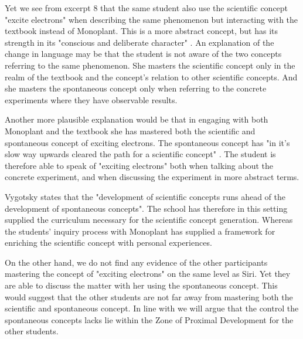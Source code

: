 
Yet we see from excerpt 8 that the same student also use the scientific concept "excite electrons" when describing the same phenomenon but interacting with the textbook instead of Monoplant. This is a more abstract concept, but has its strength in its "conscious and deliberate character" \citep{vygotsky2012thought}. An explanation of the change in language may be that the student is not aware of the two concepts referring to the same phenomenon. She masters the scientific concept only in the realm of the textbook and the concept's relation to other scientific concepts. And she masters the spontaneous concept only when referring to the concrete experiments where they have observable results. 

Another more plausible explanation would be that in engaging with both Monoplant and the textbook she has mastered both the scientific and spontaneous concept of exciting electrons. The spontaneous concept has "in it's slow way upwards cleared the path for a scientific concept" \citep{vygotsky2012thought}. The student is therefore able to speak of "exciting electrons" both when talking about the concrete experiment, and when discussing the experiment in more abstract terms. 

Vygotsky states that the "development of scientific concepts runs ahead of the development of spontaneous concepts". The school has therefore in this setting supplied the curriculum necessary for the scientific concept generation. Whereas the students' inquiry process with Monoplant has supplied a framework for enriching the scientific concept with personal experiences.

On the other hand, we do not find any evidence of the other participants mastering the concept of "exciting electrons" on the same level as Siri. Yet they are able to discuss the matter with her using the spontaneous concept. This would suggest that the other students are not far away from mastering both the scientific and spontaneous concept. In line with \citet{vygotsky2012thought} we will argue that the control the spontaneous concepts lacks lie within the Zone of Proximal Development for the other students. 


